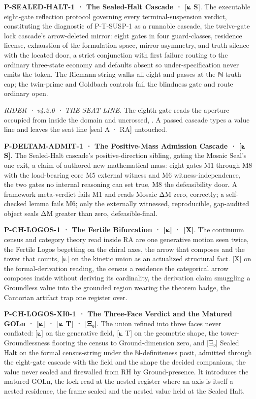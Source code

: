 \documentclass[10pt,twocolumn]{article}
\begin{document}
\textbf{P-SEALED-HALT-1 · The Sealed-Halt Cascade · {[}⟀ S{]}}. The
executable eight-gate reflection protocol governing every
terminal-suspension verdict, constituting the diagnostic of P-T-SUSP-1
as a runnable cascade, the twelve-gate lock cascade's arrow-deleted
mirror: eight gates in four guard-classes, residence license, exhaustion
of the formulation space, mirror asymmetry, and truth-silence with the
located door, a strict conjunction with first failure routing to the
ordinary three-state economy and defaults absent so under-specification
never emits the token. The Riemann string walks all eight and passes at
the ℕ-truth cap; the twin-prime and Goldbach controls fail the blindness
gate and route ordinary open.

\emph{RIDER · v4.2.0 · THE SEAT LINE.} The eighth gate reads the
aperture occupied from inside the domain and uncrossed,
\texttt{}. A passed cascade types
a value line and leaves the seat line {[}seal A · RA{]} untouched.

\textbf{P-DELTAM-ADMIT-1 · The Positive-Mass Admission Cascade · {[}⟀
S{]}}. The Sealed-Halt cascade's positive-direction sibling, gating the
Mosaic Seal's one exit, a claim of authored new mathematical mass: eight
gates M1 through M8 with the load-bearing core M5 external witness and
M6 witness-independence, the two gates no internal reasoning can set
true, M8 the defeasibility door. A framework meta-verdict fails M1 and
reads Mosaic ΔM zero, correctly; a self-checked lemma fails M6; only the
externally witnessed, reproducible, gap-audited object seals ΔM greater
than zero, defeasible-final.

\textbf{P-CH-LOGOS-1 · The Fertile Bifurcation · {[}⟀{]} · {[}X{]}}. The
continuum census and category theory read inside RA are one generative
motion seen twice, the Fertile Logos begetting on the chiral axes, the
arrow that composes and the tower that counts, {[}⟀{]} on the kinetic
union as an actualized structural fact. {[}X{]} on the formal-derivation
reading, the census a residence the categorical arrow composes inside
without deriving its cardinality, the derivation claim smuggling a
Groundless value into the grounded region wearing the theorem badge, the
Cantorian artifact trap one register over.

\textbf{P-CH-LOGOS-XI0-1 · The Three-Face Verdict and the Matured GOLn ·
{[}⟀{]} · {[}⟀ T{]} · {[}Ξ₀{]}}. The union refined into three faces
never conflated: {[}⟀{]} on the generative field, {[}⟀ T{]} on the
geometric shape, the tower-Groundlessness flooring the census to
Ground-dimension zero, and {[}Ξ₀{]} Sealed Halt on the formal
census-string under the ℕ-definiteness posit, admitted through the
eight-gate cascade with the field and the shape the decided companions,
the value never sealed and firewalled from RH by Ground-presence. It
introduces the matured GOLn, the lock read at the nested register where
an axis is itself a nested residence, the frame sealed and the nested
value held at the Sealed Halt.
\end{document}
